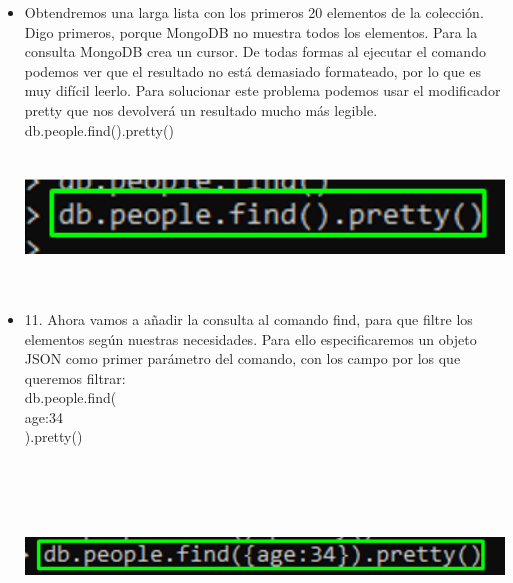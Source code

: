 \documentclass[12pt,a4paper,oneside]{book}
\begin{document}
	\newpage
\begin{itemize}
	\item {Obtendremos una larga lista con los primeros 20 elementos de la colección. Digo primeros, porque MongoDB no muestra todos los elementos. Para la consulta MongoDB crea un cursor. De todas formas al ejecutar el comando podemos ver que el resultado no está demasiado formateado, por lo que es muy difícil leerlo. Para solucionar este problema podemos usar el modificador pretty que nos devolverá un resultado mucho más legible.\\
		
	db.people.find().pretty()
	}\\
	
	\includegraphics[width=16cm, height=4cm]{img/12.png}\\
	
	
	
	\item {11.	Ahora vamos a añadir la consulta al comando find, para que filtre los elementos según nuestras necesidades. Para ello especificaremos un objeto JSON como primer parámetro del comando, con los campo por los que queremos filtrar:\\
		
		db.people.find(\\
		{age:34}\\
		).pretty()
	
	
	}\\	
	\includegraphics[width=16cm, height=4cm]{img/13.png}\\
	
	
\end{itemize}
\end{document}
